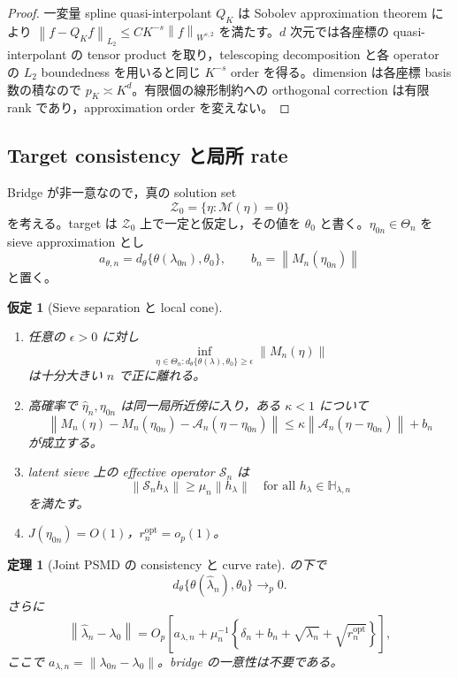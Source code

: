 \documentclass[11pt,a4paper]{ltjsarticle}
\newtheorem{assumption}{仮定}[section]
\newtheorem{theorem}{定理}[section]
\theoremstyle{remark}
\newcommand{\wh}{\widehat}
\newcommand{\norm}[1]{\left\lVert#1\right\rVert}
\newcommand{\cZ}{\mathcal Z}
\newcommand{\Mop}{\mathscr M}
\newcommand{\Aop}{\mathscr A}
\newcommand{\Sop}{\mathscr S}
\begin{document}
\begin{proof}
一変量 spline quasi-interpolant $Q_K$ は Sobolev approximation theorem により
$\norm{f-Q_Kf}_{L_2}\le CK^{-s}\norm f_{W^{s,2}}$ を満たす。$d$ 次元では各座標の quasi-interpolant の tensor product を取り，telescoping decomposition と各 operator の $L_2$ boundedness を用いると同じ $K^{-s}$ order を得る。dimension は各座標 basis 数の積なので $p_K\asymp K^d$。有限個の線形制約への orthogonal correction は有限 rank であり，approximation order を変えない。
\end{proof}

\subsection{Target consistency と局所 rate}
Bridge が非一意なので，真の solution set
\[
\cZ_0=\{\eta:\Mop(\eta)=0\}
\]
を考える。target は $\cZ_0$ 上で一定と仮定し，その値を $\theta_0$ と書く。$\eta_{0n}\in\Theta_n$ を sieve approximation とし
\[
a_{\theta,n}=d_\theta\{\theta(\lambda_{0n}),\theta_0\},
\qquad
b_n=\norm{M_n(\eta_{0n})}
\]
と置く。

\begin{assumption}[Sieve separation と local cone]\label{as:sieverate}
\begin{enumerate}[label=(SR\arabic*)]
\item 任意の $\epsilon>0$ に対し
\[
\inf_{\eta\in\Theta_n:
 d_\theta\{\theta(\lambda),\theta_0\}\ge\epsilon}
\norm{M_n(\eta)}
\]
は十分大きい $n$ で正に離れる。
\item 高確率で $\wh\eta_n,\eta_{0n}$ は同一局所近傍に入り，ある $\kappa<1$ について
\begin{equation}
\norm{M_n(\eta)-M_n(\eta_{0n})-
\Aop_n(\eta-\eta_{0n})}
\le\kappa\norm{\Aop_n(\eta-\eta_{0n})}+b_n
\label{eq:sievecone}
\end{equation}
が成立する。
\item latent sieve 上の effective operator $\Sop_n$ は
\begin{equation}
\norm{\Sop_n h_\lambda}
\ge\mu_n\norm{h_\lambda}
\quad\text{for all }h_\lambda\in\mathbb H_{\lambda,n}
\label{eq:mun}
\end{equation}
を満たす。
\item $J(\eta_{0n})=O(1)$，$r_n^{\mathrm{opt}}=o_p(1)$。
\end{enumerate}
\end{assumption}

\begin{theorem}[Joint PSMD の consistency と curve rate]\label{thm:psmdrate2}
の下で
\[
d_\theta\{\theta(\wh\lambda_n),\theta_0\}\to_p0.
\]
さらに
\begin{equation}
\norm{\wh\lambda_n-\lambda_0}
=O_p\left[
 a_{\lambda,n}
+\mu_n^{-1}
\left\{
\delta_n+b_n+\sqrt{\lambda_n}
+\sqrt{r_n^{\mathrm{opt}}}
\right\}
\right],
\label{eq:curverate}
\end{equation}
ここで $a_{\lambda,n}=\norm{\lambda_{0n}-\lambda_0}$。bridge の一意性は不要である。
\end{theorem}
\end{document}
